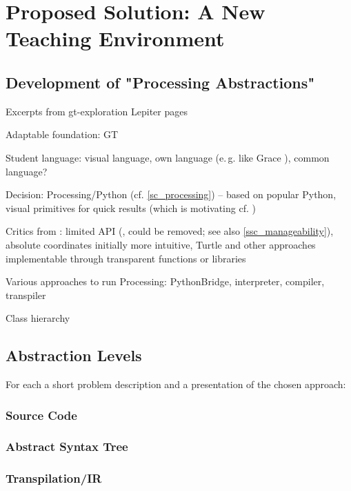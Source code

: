 
\chapter{Proposed Solution: A New Teaching Environment} \label{ch_pa}

\section{Development of "Processing Abstractions"}
Excerpts from gt-exploration Lepiter pages

\begin{todo}
\item Adaptable foundation: GT
\item Student language: visual language, own language (e.\,g. like Grace \cite{Bla18}), common language?
\item Decision: Processing/Python (cf. \ref{sc_processing}) -- based on popular Python, visual primitives for quick results (which is motivating cf. \cite{Chi23})
\item Critics from \cite{Chi23}: limited API (,  could be removed; see also \ref{ssc_manageability}), absolute coordinates initially more intuitive, Turtle and other approaches implementable through transparent functions or libraries
\item Various approaches to run Processing: PythonBridge, interpreter, compiler, transpiler
\item Class hierarchy
\end{todo}


\section{Abstraction Levels}
For each a short problem description and a presentation of the chosen approach:

\subsection{Source Code}
\subsection{Abstract Syntax Tree}
\subsection{Transpilation/IR}
